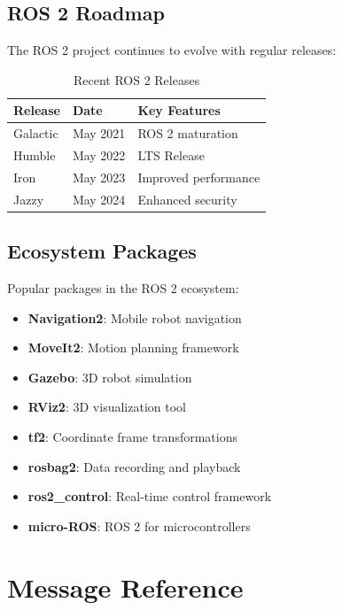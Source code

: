 \documentclass[a4paper,12pt]{book}
\newcommand{\important}[1]{\textbf{\color{ros2orange}#1}}
\begin{document}
\section{ROS 2 Roadmap}

The ROS 2 project continues to evolve with regular releases:

\begin{table}[H]
\centering
\begin{tabular}{|l|l|l|}
\hline
\textbf{Release} & \textbf{Date} & \textbf{Key Features} \\
\hline
Galactic & May 2021 & ROS 2 maturation \\
\hline
Humble & May 2022 & LTS Release \\
\hline
Iron & May 2023 & Improved performance \\
\hline
Jazzy & May 2024 & Enhanced security \\
\hline
\end{tabular}
\caption{Recent ROS 2 Releases}
\label{tab:ros2_releases}
\end{table}

\section{Ecosystem Packages}

Popular packages in the ROS 2 ecosystem:

\begin{itemize}
\item \important{Navigation2}: Mobile robot navigation
\item \important{MoveIt2}: Motion planning framework
\item \important{Gazebo}: 3D robot simulation
\item \important{RViz2}: 3D visualization tool
\item \important{tf2}: Coordinate frame transformations
\item \important{rosbag2}: Data recording and playback
\item \important{ros2\_control}: Real-time control framework
\item \important{micro-ROS}: ROS 2 for microcontrollers
\end{itemize}

\appendix

\chapter{Message Reference}
\end{document}
